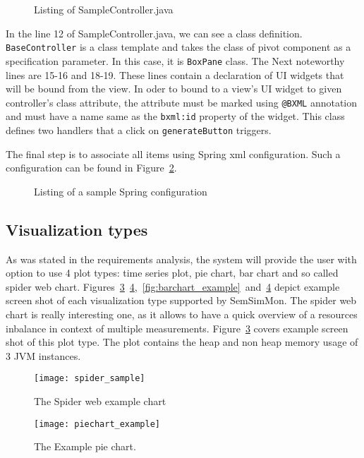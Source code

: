 \begin{figure}[ht]
\centering
 
\caption{Listing of SampleController.java}
\label{fig:sample_controller}
\end{figure} 

In the line 12 of SampleController.java, we can see a class definition. \texttt{BaseController} is a class template and takes the class of pivot component as a specification parameter. In this case, it is \texttt{BoxPane} class. The Next noteworthy lines are 15-16 and 18-19. These lines contain a declaration of UI widgets that will be bound from the view. In oder to bound to a view\rq{}s UI widget to given controller\rq{}s class attribute, the attribute must be marked using \texttt{@BXML} annotation and must have a name same as the \texttt{bxml:id} property of the widget. This class defines two handlers that a click on \texttt{generateButton} triggers.

The final step is to associate all items using Spring xml configuration. Such a configuration can be found in Figure~\ref{fig:sample_spring}.

\begin{figure}[ht]
\centering
 
\caption{Listing of a sample Spring configuration}
\label{fig:sample_spring}
\end{figure}

\subsection{Visualization types}

As was stated in the requirements analysis, the system will provide the user with option to use 4 plot types: time series plot, pie chart, bar chart and so called spider web chart. Figures~\ref{fig:spider_sample}~\ref{fig:piechart_example},~\ref{fig:barchart_example}~and~\ref{fig:piechart_example} depict example screen shot of each visualization type supported by SemSimMon. The spider web chart is really interesting one, as it allows to have a quick overview of a resources inbalance in context of multiple measurements. Figure~\ref{fig:spider_sample} covers example screen shot of this plot type. The plot contains the heap and non heap memory usage of 3 JVM instances.


\begin{figure}[ht]
\centering
\texttt{[image: spider\_sample]}
\caption{The Spider web example chart}
\label{fig:spider_sample}
\end{figure}
\clearpage
\begin{figure}[ht]
\centering
\texttt{[image: piechart\_example]}
\caption{The Example pie chart.}
\label{fig:piechart_example}
\end{figure}

